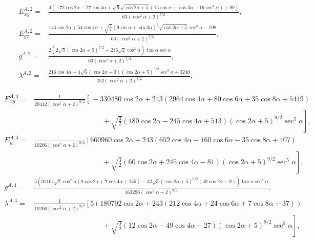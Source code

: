 \documentclass[a4paper,prb]{revtex4-1}  %
\begin{document}
{%


\begin{align}
E_{xy}^{A,2} =& \frac{4 \left(-72 \cos 2 \alpha -27 \cos 4 \alpha +\sqrt{6} \sqrt{\cos 2 \alpha +5} \left(15 \cos \alpha +\cos 3 \alpha -16 \sec ^3\alpha \right)+99\right)}{63 \left(\cos ^2\alpha +2\right)^{5/2}},\\
E_{yz}^{A,2} =&\frac{144 \cos 2 \alpha +54 \cos 4 \alpha +\sqrt{\frac{3}{2}} (9 \sin \alpha +\sin 3 \alpha )^2 \sqrt{\cos 2 \alpha +5} \sec ^3\alpha -198}{63 \left(\cos ^2\alpha +2\right)^{5/2}},\\
g^{A,2} =&\frac{2 \left(2 \sqrt{3} (\cos 2 \alpha +5)^{5/2}-216 \sqrt{2} \cos ^5\alpha \right) \tan \alpha  \sec \alpha }{63 \left(\cos ^2\alpha +2\right)^{5/2}},\\
\lambda^{A,2} =&\frac{216 \cos 4 \alpha -4 \sqrt{6} (\cos 2 \alpha +3) (\cos 2 \alpha +5)^{5/2} \sec ^3\alpha +3240}{252 \left(\cos ^2\alpha +2\right)^{5/2}},
\end{align}



\begin{align}
E_{xy}^{A,4} =& \frac{1}{20412 \left(\cos ^2\alpha +2\right)^{9/2}}
\left[\frac{}{} -330480 \cos 2 \alpha +243 (2964 \cos 4 \alpha +80 \cos 6 \alpha +35 \cos 8 \alpha +5449)\right.\\
&\hspace{4cm} + \left. \sqrt{\frac{3}{2}} (180 \cos 2 \alpha -245 \cos 4 \alpha +513) (\cos 2 \alpha +5)^{9/2} \sec ^5\alpha \right],\\
E_{yz}^{A,4} =& \frac{}{10206 \left(\cos ^2\alpha +2\right)^{9/2}}
\left[660960 \cos 2 \alpha +243 (652 \cos 4 \alpha -160 \cos 6 \alpha -35 \cos 8 \alpha +407)\right.\\
&\hspace{4cm} + \left.\sqrt{\frac{3}{2}} (60 \cos 2 \alpha +245 \cos 4 \alpha -81) (\cos 2 \alpha +5)^{9/2} \sec ^5\alpha \right],\\
g^{A,4} =& \frac{5 \left(31104 \sqrt{2} \cos ^7\alpha  (8 \cos 2 \alpha +7 \cos 4 \alpha +145)-32 \sqrt{3} (\cos 2 \alpha +5)^{9/2} (49 \cos 2 \alpha -9)\right) \tan \alpha  \sec ^3\alpha }{163296 \left(\cos ^2\alpha +2\right)^{9/2}},\\
\lambda^{A,4} =& \frac{1}{10206 \left(\cos ^2\alpha +2\right)^{9/2}}
\left[5 \left(180792 \cos 2 \alpha +243 (212 \cos 4 \alpha +24 \cos 6 \alpha +7 \cos 8 \alpha +37)\right)\right.\\
&\hspace{4cm} + \left.\sqrt{\frac{3}{2}} (12 \cos 2 \alpha -49 \cos 4 \alpha -27) (\cos 2 \alpha +5)^{9/2} \sec ^5\alpha \right],
\end{align}



}
\end{document}
